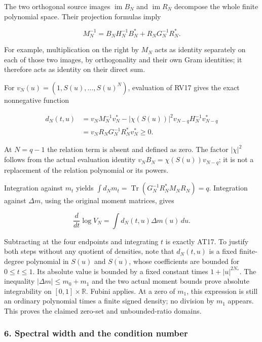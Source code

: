 \documentclass{article}
\begin{document}
The two orthogonal source images \(\operatorname{im}B_N\) and \(\operatorname{im}R_N\) decompose the whole finite polynomial space. Their projection formulas imply

\[
M_N^{-1}=B_NH_N^{-1}B_N^*+
R_NG_N^{-1}R_N^*.
\tag{RV17}
\]

For example, multiplication on the right by \(M_N\) acts as identity separately on each of those two images, by orthogonality and their own Gram identities; it therefore acts as identity on their direct sum.

For \(v_N(u)=(1,S(u),\ldots,S(u)^N)\), evaluation of RV17 gives the exact nonnegative function

\[
\begin{aligned}
d_N(t,u)
&=v_NM_N^{-1}v_N^*
-|\chi(S(u))|^2v_{N-q}H_N^{-1}v_{N-q}^*\\
&=v_NR_NG_N^{-1}R_N^*v_N^*\ge0.
\end{aligned}
\tag{RV18}
\]

At \(N=q-1\) the relation term is absent and defined as zero. The factor \(|\chi|^2\) follows from the actual evaluation identity \(v_N B_N=\chi(S(u))v_{N-q}\); it is not a replacement of the relation polynomial or its powers.

Integration against \(m_t\) yields \(\int d_Nm_t=\operatorname{Tr}(G_N^{-1}R_N^*M_NR_N)=q\). Integration against \(\Delta m\), using the original moment matrices, gives

\[
\frac d{dt}\log V_N=\int d_N(t,u)\Delta m(u)\,du.
\tag{RV19}
\]

Subtracting at the four endpoints and integrating \(t\) is exactly AT17. To justify both steps without any quotient of densities, note that \(d_N(t,u)\) is a fixed finite-degree polynomial in \(S(u)\) and \(\overline{S(u)}\), whose coefficients are bounded for \(0\le t\le1\). Its absolute value is bounded by a fixed constant times \(1+|u|^{2N_*}\). The inequality \(|\Delta m|\le m_0+m_1\) and the two actual moment bounds prove absolute integrability on \([0,1]\times\mathbb R\). Fubini applies. At a zero of \(m_1\), this expression is still an ordinary polynomial times a finite signed density; no division by \(m_1\) appears. This proves the claimed zero-set and unbounded-ratio domains.

\subsubsection{6. Spectral width and the condition number}\label{endpoint-determinant_review--spectral-width-and-the-condition-number}
\end{document}
